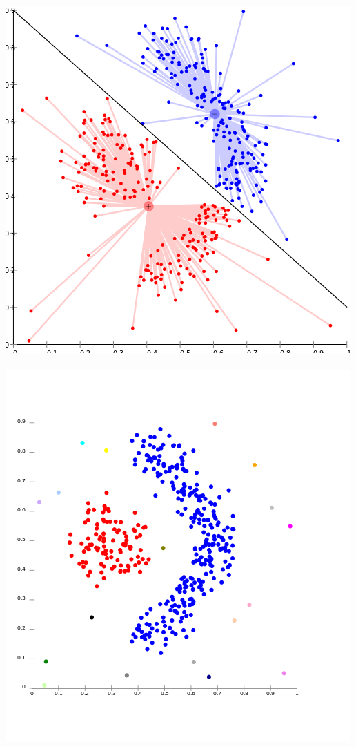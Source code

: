\documentclass{beamer}
\begin{document}
\begin{frame}
\begin{columns}[c]
			\includegraphics[width=\textwidth]{images/cluster_centroid.png} \\
			\hfill \\
			\includegraphics[width=\textwidth]{images/cluster_link.png} \\
	\end{columns}
\end{frame}
\end{document}
